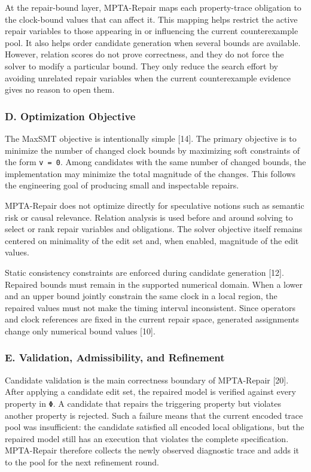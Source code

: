 \documentclass[
]{article}
\begin{document}
At the repair-bound layer, MPTA-Repair maps each property-trace
obligation to the clock-bound values that can affect it. This mapping
helps restrict the active repair variables to those appearing in or
influencing the current counterexample pool. It also helps order
candidate generation when several bounds are available. However,
relation scores do not prove correctness, and they do not force the
solver to modify a particular bound. They only reduce the search effort
by avoiding unrelated repair variables when the current counterexample
evidence gives no reason to open them.

\subsubsection{D. Optimization
Objective}\label{d.-optimization-objective}

The MaxSMT objective is intentionally simple {[}14{]}. The primary
objective is to minimize the number of changed clock bounds by
maximizing soft constraints of the form \texttt{v\ =\ 0}. Among
candidates with the same number of changed bounds, the implementation
may minimize the total magnitude of the changes. This follows the
engineering goal of producing small and inspectable repairs.

MPTA-Repair does not optimize directly for speculative notions such as
semantic risk or causal relevance. Relation analysis is used before and
around solving to select or rank repair variables and obligations. The
solver objective itself remains centered on minimality of the edit set
and, when enabled, magnitude of the edit values.

Static consistency constraints are enforced during candidate generation
{[}12{]}. Repaired bounds must remain in the supported numerical domain.
When a lower and an upper bound jointly constrain the same clock in a
local region, the repaired values must not make the timing interval
inconsistent. Since operators and clock references are fixed in the
current repair space, generated assignments change only numerical bound
values {[}10{]}.

\subsubsection{E. Validation, Admissibility, and
Refinement}\label{e.-validation-admissibility-and-refinement}

Candidate validation is the main correctness boundary of MPTA-Repair
{[}20{]}. After applying a candidate edit set, the repaired model is
verified against every property in \texttt{Φ}. A candidate that repairs
the triggering property but violates another property is rejected. Such
a failure means that the current encoded trace pool was insufficient:
the candidate satisfied all encoded local obligations, but the repaired
model still has an execution that violates the complete specification.
MPTA-Repair therefore collects the newly observed diagnostic trace and
adds it to the pool for the next refinement round.
\end{document}
